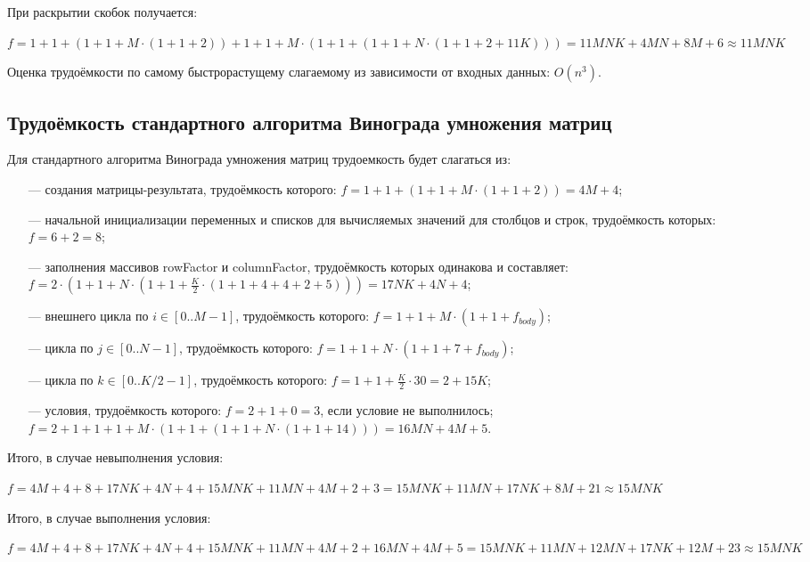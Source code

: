 При раскрытии скобок получается:

$f = 1 + 1 + (1 + 1 + M \cdot (1 + 1 + 2)) + 1 + 1 + M \cdot (1 + 1 + (1 + 1 + N \cdot (1 + 1 + 2 + 11K))) = 11MNK + 4MN + 8M + 6 \approx 11MNK$

Оценка трудоёмкости по самому быстрорастущему слагаемому из зависимости от входных данных: $O(n^3)$.

\subsection{Трудоёмкость стандартного алгоритма Винограда умножения матриц}

Для стандартного алгоритма Винограда умножения матриц трудоемкость будет слагаться из:

\begin{itemize}
	\item[---] создания матрицы-результата, трудоёмкость которого: $f = 1 + 1 + (1 + 1 + M \cdot (1 + 1 + 2)) = 4M+4$;
	\item[---] начальной инициализации переменных и списков для вычисляемых значений для столбцов и строк, трудоёмкость которых: $f = 6 + 2 = 8$;
	\item[---] заполнения массивов rowFactor и columnFactor, трудоёмкость которых одинакова и составляет: $f = 2 \cdot (1 + 1 + N \cdot (1 + 1 + \frac{K}{2} \cdot (1 + 1 + 4 + 4 + 2 + 5))) = 17NK + 4N + 4$; 
	\item[---] внешнего цикла по $i \in [0..M-1]$, трудоёмкость которого: $f = 1 + 1 + M \cdot (1 + 1 + f_{body})$;
	\item[---] цикла по $j \in [0..N-1]$, трудоёмкость которого: $f = 1 + 1 + N \cdot (1 + 1 + 7 + f_{body})$;
	\item[---] цикла по $k \in [0..K/2-1]$, трудоёмкость которого: $f = 1 + 1 + \frac{K}{2} \cdot 30 = 2 + 15K$;
	\item[---] условия, трудоёмкость которого: $f = 2 + 1 + 0 = 3$, если условие не выполнилось; $f = 2 + 1 + 1 + 1 + M \cdot (1 + 1 + (1 + 1 + N \cdot (1 + 1 + 14))) = 16MN+4M+5$.
\end{itemize}

Итого, в случае невыполнения условия:

$f = 4M+4+8+17NK+4N+4+15MNK+11MN+4M+2+3=15MNK + 11MN+17NK+8M+21 \approx 15MNK$

Итого, в случае выполнения условия:

$f = 4M+4+8+17NK+4N+4+15MNK+11MN+4M+2+16MN+4M+5=15MNK + 11MN+12MN+17NK+12M+23 \approx 15MNK$

